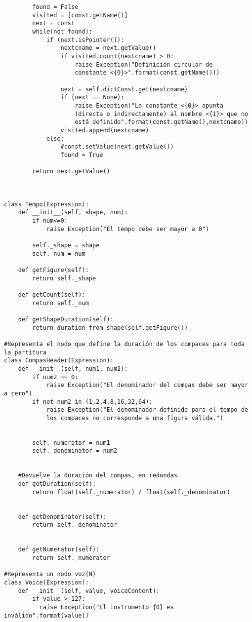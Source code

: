 \begin{verbatim}
        found = False
        visited = [const.getName()]
        next = const
        while(not found):
            if (next.isPointer()):
                nextcname = next.getValue()
                if visited.count(nextcname) > 0:
                    raise Exception("Definición circular de 
                    constante <{0}>".format(const.getName()))

                next = self.dictConst.get(nextcname)
                if (next == None):
                    raise Exception("La constante <{0}> apunta 
                    (directa o indirectamente) al nombre <{1}> que no 
                    está definido".format(const.getName(),nextcname))
                visited.append(nextcname)
            else:
                #const.setValue(next.getValue())
                found = True

        return next.getValue()



class Tempo(Expression):
    def __init__(self, shape, num):
        if num<=0:
            raise Exception("El tempo debe ser mayor a 0")

        self._shape = shape
        self._num = num

    def getFigure(self):
        return self._shape

    def getCount(self):
        return self._num

    def getShapeDuration(self):
        return duration_from_shape(self.getFigure())

#Representa el nodo que define la duración de los compaces para toda la partitura
class CompasHeader(Expression):
    def __init__(self, num1, num2):
        if num2 == 0:
            raise Exception("El denominador del compas debe ser mayor a cero")
        if not num2 in (1,2,4,8,16,32,64):
            raise Exception("El denominador definido para el tempo de 
            los compaces no corresponde a una figura válida.")


        self._numerator = num1
        self._denominator = num2


    #Devuelve la duración del compas, en redondas
    def getDuration(self):
        return float(self._numerator) / float(self._denominator)


    def getDenominator(self):
        return self._denominator


    def getNumerator(self):
        return self._numerator

#Representa un nodo voz(N)
class Voice(Expression):
    def __init__(self, value, voiceContent):
        if value > 127:
          raise Exception("El instrumento {0} es inválido".format(value))


\end{verbatim}
